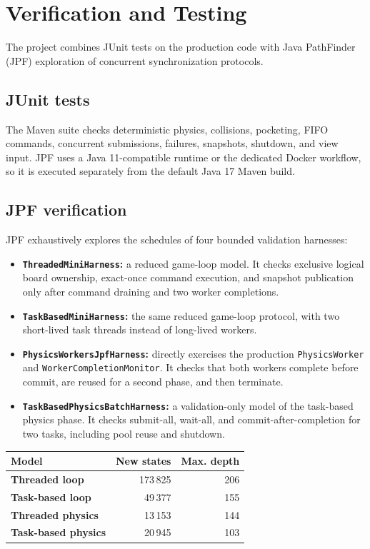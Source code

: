 \clearpage
\section{Verification and Testing}

The project combines JUnit tests on the production code with Java PathFinder
(JPF) exploration of concurrent synchronization protocols.

\subsection{JUnit tests}

The Maven suite checks deterministic physics, collisions, pocketing, FIFO
commands, concurrent submissions, failures, snapshots, shutdown, and view
input. JPF uses a Java 11-compatible runtime or the dedicated Docker workflow,
so it is executed separately from the default Java 17 Maven build.

\subsection{JPF verification}

JPF exhaustively explores the schedules of four bounded validation harnesses:

\begin{itemize}
    \item \textbf{\texttt{ThreadedMiniHarness}:} a reduced game-loop model.
    It checks exclusive logical board ownership, exact-once command execution,
    and snapshot publication only after command draining and two worker
    completions.
    \item \textbf{\texttt{TaskBasedMiniHarness}:} the same reduced game-loop
    protocol, with two short-lived task threads instead of long-lived workers.
    \item \textbf{\texttt{PhysicsWorkersJpfHarness}:} directly exercises the
    production \texttt{PhysicsWorker} and \texttt{WorkerCompletionMonitor}.
    It checks that both workers complete before commit, are reused for a second
    phase, and then terminate.
    \item \textbf{\texttt{TaskBasedPhysicsBatchHarness}:} a validation-only
    model of the task-based physics phase. It checks submit-all, wait-all, and
    commit-after-completion for two tasks, including pool reuse and shutdown.
\end{itemize}

\begin{center}
\small
\begin{tabular}{|>{\bfseries}p{3.2cm}|r|r|}
    \hline
    Model & New states & Max. depth \\
    \hline
    Threaded loop & 173\,825 & 206 \\
    \hline
    Task-based loop & 49\,377 & 155 \\
    \hline
    Threaded physics & 13\,153 & 144 \\
    \hline
    Task-based physics & 20\,945 & 103 \\
    \hline
\end{tabular}
\end{center}


